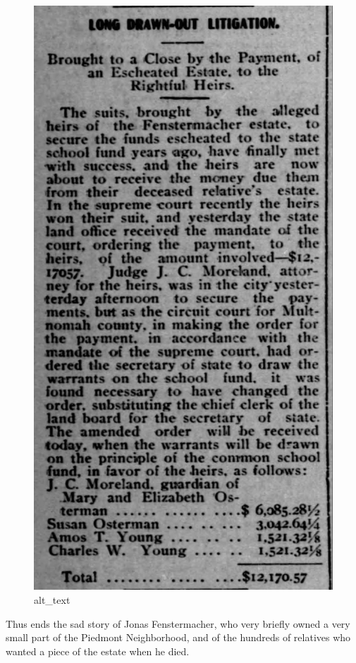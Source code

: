 \documentclass[
  12pt,
]{book}
\begin{document}
\begin{figure}
\centering
\includegraphics{images/0204b_images/image7.jpg}
\caption{alt\_text}
\end{figure}

Thus ends the sad story of Jonas Fenstermacher, who very briefly owned a very small part of the Piedmont Neighborhood, and of the hundreds of relatives who wanted a piece of the estate when he died.
\end{document}
